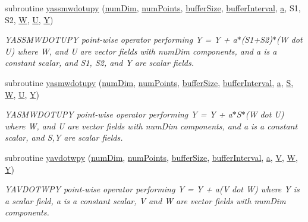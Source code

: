 \begin{DoxyCompactItemize}
subroutine \hyperlink{namespacesimple_a09474af35d990198966e2950a33ba9d5}{yassmwdotupy} (\hyperlink{SATKernels_8H_a680185db8546de161968dabace9e94f1}{num\+Dim}, \hyperlink{ViscidKernels_8H_adf0bf75d0875d1bb42a5348bee7b7bfd}{num\+Points}, \hyperlink{SpecialKernels_8H_aa9426cdf16e85054db35e88f9b68c6be}{buffer\+Size}, \hyperlink{WENOKernels_8H_ad1001168d5432b52e6d0636f4dc0e60c}{buffer\+Interval}, \hyperlink{SimpleKernels_8H_a80f0b648bfd720a2277538fbad1d1eca}{a}, S1, S2, \hyperlink{SimpleKernels_8H_a47539bc7159e013320007f51fcbf1fe3}{W}, \hyperlink{SimpleKernels_8H_aca4ab6143606c908fb1a7de286ddddae}{U}, \hyperlink{SimpleKernels_8H_a4731ec58a5102a3b2d3116eaff33f108}{Y})
\begin{DoxyCompactList}\small\item\em Y\+A\+S\+S\+M\+W\+D\+O\+T\+U\+PY point-\/wise operator performing Y = Y + a$\ast$(S1+\+S2)$\ast$(W dot U) where W, and U are vector fields with num\+Dim components, and a is a constant scalar, and S1, S2, and Y are scalar fields. \end{DoxyCompactList}\item 
subroutine \hyperlink{namespacesimple_a8f61bdc8c6ab35cdd9d71616200fd9f4}{yasmwdotupy} (\hyperlink{SATKernels_8H_a680185db8546de161968dabace9e94f1}{num\+Dim}, \hyperlink{ViscidKernels_8H_adf0bf75d0875d1bb42a5348bee7b7bfd}{num\+Points}, \hyperlink{SpecialKernels_8H_aa9426cdf16e85054db35e88f9b68c6be}{buffer\+Size}, \hyperlink{WENOKernels_8H_ad1001168d5432b52e6d0636f4dc0e60c}{buffer\+Interval}, \hyperlink{SimpleKernels_8H_a80f0b648bfd720a2277538fbad1d1eca}{a}, \hyperlink{SimpleKernels_8H_a1851b05129a14a393984de733889e64b}{S}, \hyperlink{SimpleKernels_8H_a47539bc7159e013320007f51fcbf1fe3}{W}, \hyperlink{SimpleKernels_8H_aca4ab6143606c908fb1a7de286ddddae}{U}, \hyperlink{SimpleKernels_8H_a4731ec58a5102a3b2d3116eaff33f108}{Y})
\begin{DoxyCompactList}\small\item\em Y\+A\+S\+M\+W\+D\+O\+T\+U\+PY point-\/wise operator performing Y = Y + a$\ast$\+S$\ast$(W dot U) where W, and U are vector fields with num\+Dim components, and a is a constant scalar, and S,Y are scalar fields. \end{DoxyCompactList}\item 
subroutine \hyperlink{namespacesimple_ae052725aabe2937b940c96be18e975d9}{yavdotwpy} (\hyperlink{SATKernels_8H_a680185db8546de161968dabace9e94f1}{num\+Dim}, \hyperlink{ViscidKernels_8H_adf0bf75d0875d1bb42a5348bee7b7bfd}{num\+Points}, \hyperlink{SpecialKernels_8H_aa9426cdf16e85054db35e88f9b68c6be}{buffer\+Size}, \hyperlink{WENOKernels_8H_ad1001168d5432b52e6d0636f4dc0e60c}{buffer\+Interval}, \hyperlink{SimpleKernels_8H_a80f0b648bfd720a2277538fbad1d1eca}{a}, \hyperlink{SpecialKernels_8H_ac6b3e75b07df9bb98a9911c89819ba5a}{V}, \hyperlink{SimpleKernels_8H_a47539bc7159e013320007f51fcbf1fe3}{W}, \hyperlink{SimpleKernels_8H_a4731ec58a5102a3b2d3116eaff33f108}{Y})
\begin{DoxyCompactList}\small\item\em Y\+A\+V\+D\+O\+T\+W\+PY point-\/wise operator performing Y = Y + a(\+V dot W) where Y is a scalar field, a is a constant scalar, V and W are vector fields with num\+Dim components. \end{DoxyCompactList}\end{DoxyCompactItemize}
